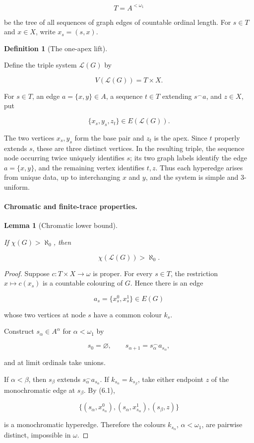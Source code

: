 \documentclass[a4paper,11pt,reqno]{amsart}
\theoremstyle{plain}
\newtheorem{lemma}[theorem]{Lemma}
\theoremstyle{definition}
\newtheorem{definition}[theorem]{Definition}
\theoremstyle{remark}
\begin{document}
\[
T=A^{<\omega_1}
\]

be the tree of all sequences of graph edges of countable ordinal length. For \(s\in T\) and \(x\in X\), write \(x_s=(s,x)\).

\begin{definition}[The one-apex lift]\label{definition-6.1-the-one-apex-lift}

Define the triple system \(\mathcal L(G)\) by

\[
V(\mathcal L(G))=T\times X.
\]

For \(s\in T\), an edge \(a=\{x,y\}\in A\), a sequence \(t\in T\) extending \(s^\frown a\), and \(z\in X\), put

\[
\{x_s,y_s,z_t\}\in E(\mathcal L(G)). \tag{6.1}
\]

The two vertices \(x_s,y_s\) form the base pair and \(z_t\) is the apex. Since \(t\) properly extends \(s\), these are three distinct vertices. In the resulting triple, the sequence node occurring twice uniquely identifies \(s\); its two graph labels identify the edge \(a=\{x,y\}\), and the remaining vertex identifies \(t,z\). Thus each hyperedge arises from unique data, up to interchanging \(x\) and \(y\), and the system is simple and \(3\)-uniform.

\end{definition}

\paragraph{Chromatic and finite-trace properties.}\label{chromatic-and-finite-trace-properties}

\begin{lemma}[Chromatic lower bound]\label{lemma-6.2-chromatic-lower-bound}

If \(\chi(G)>\aleph_0\), then

\[
\chi(\mathcal L(G))>\aleph_0.
\]

\end{lemma}
\begin{proof}
Suppose \(c:T\times X\to\omega\) is proper. For every \(s\in T\), the restriction \(x\mapsto c(x_s)\) is a countable colouring of \(G\). Hence there is an edge

\[
a_s=\{x_s^0,x_s^1\}\in E(G)
\]

whose two vertices at node \(s\) have a common colour \(k_s\).

Construct \(s_\alpha\in A^\alpha\) for \(\alpha<\omega_1\) by

\[
s_0=\varnothing,
\qquad s_{\alpha+1}=s_\alpha^\frown a_{s_\alpha},
\]

and at limit ordinals take unions.

If \(\alpha<\beta\), then \(s_\beta\) extends \(s_\alpha^\frown a_{s_\alpha}\). If \(k_{s_\alpha}=k_{s_\beta}\), take either endpoint \(z\) of the monochromatic edge at \(s_\beta\). By (6.1),

\[
\{(s_\alpha,x_{s_\alpha}^0),
  (s_\alpha,x_{s_\alpha}^1),
  (s_\beta,z)\}
\]

is a monochromatic hyperedge. Therefore the colours \(k_{s_\alpha}\), \(\alpha<\omega_1\), are pairwise distinct, impossible in \(\omega\).
\end{proof}
\end{document}
